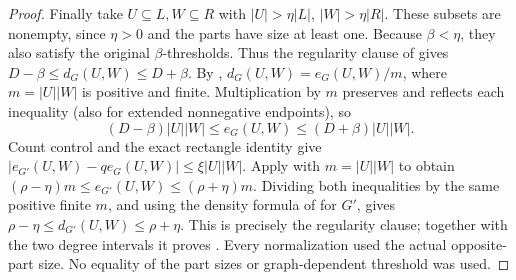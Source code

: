 \begin{proof}
Finally take $U\subseteq L,W\subseteq R$ with
$|U|>\eta|L|$, $|W|>\eta|R|$. These subsets are nonempty, since
$\eta>0$ and the parts have size at least one. Because $\beta<\eta$,
they also satisfy the original $\beta$-thresholds. Thus the regularity
clause of  gives
$D-\beta\leq d_G(U,W)\leq D+\beta$.
By , $d_G(U,W)=e_G(U,W)/m$, where
$m=|U||W|$ is positive and finite. Multiplication by $m$ preserves
and reflects each inequality (also for extended nonnegative endpoints),
so
\[
(D-\beta)|U||W|\leq e_G(U,W)\leq(D+\beta)|U||W|.
\]
Count control and the exact rectangle identity give
$|e_{G'}(U,W)-qe_G(U,W)|\leq\xi|U||W|$. Apply
 with $m=|U||W|$ to obtain
$(\rho-\eta)m\leq e_{G'}(U,W)\leq(\rho+\eta)m$.
Dividing both inequalities by the same positive finite $m$, and using
the density formula of  for $G'$, gives
$\rho-\eta\leq d_{G'}(U,W)\leq\rho+\eta$.
This is precisely the regularity clause; together with the two degree
intervals it proves . Every normalization
used the actual opposite-part size. No equality of the part sizes or
graph-dependent threshold was used.
\end{proof}
